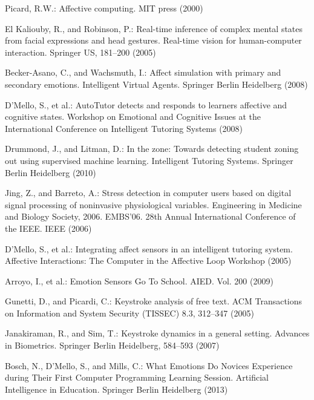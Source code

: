 \documentclass[runningheads,a4paper]{llncs}
\begin{document}
\begin{thebibliography}{4}
  
 Picard, R.W.: Affective computing. MIT press (2000)
  
 El Kaliouby, R., and Robinson, P.: Real-time inference of complex mental states from facial expressions and head gestures. Real-time vision for human-computer interaction. Springer US, 181--200 (2005)

 Becker-Asano, C., and Wachsmuth, I.: Affect simulation with primary and secondary emotions. Intelligent Virtual Agents. Springer Berlin Heidelberg (2008)

 D'Mello, S., et al.: AutoTutor detects and responds to learners affective and cognitive states. Workshop on Emotional and Cognitive Issues at the International Conference on Intelligent Tutoring Systems (2008)

 Drummond, J., and Litman, D.: In the zone: Towards detecting student zoning out using supervised machine learning. Intelligent Tutoring Systems. Springer Berlin Heidelberg (2010)

 Jing, Z., and Barreto, A.: Stress detection in computer users based on digital signal processing of noninvasive physiological variables. Engineering in Medicine and Biology Society, 2006. EMBS'06. 28th Annual International Conference of the IEEE. IEEE (2006)

 D'Mello, S., et al.: Integrating affect sensors in an intelligent tutoring system. Affective Interactions: The Computer in the Affective Loop Workshop (2005)

 Arroyo, I., et al.: Emotion Sensors Go To School. AIED. Vol. 200 (2009)

 Gunetti, D., and Picardi, C.: Keystroke analysis of free text. ACM Transactions on Information and System Security (TISSEC) 8.3, 312--347 (2005)

 Janakiraman, R., and Sim, T.: Keystroke dynamics in a general setting. Advances in Biometrics. Springer Berlin Heidelberg, 584--593 (2007)

 Bosch, N., D'Mello, S., and Mills, C.: What Emotions Do Novices Experience during Their First Computer Programming Learning Session. Artificial Intelligence in Education. Springer Berlin Heidelberg (2013)


\end{thebibliography}
\end{document}
